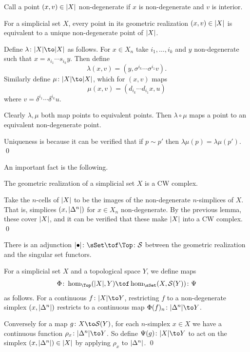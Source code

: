 \elemm

Call a point $(x,v)\in\mathopen{}\mathclose{\left|X\right|}$ {\emphcolor non-degenerate} if $x$ is non-degenerate and $v$ is interior.

\blemm

    For a simplicial set $X$, every point in its geometric realization $(x,v)\in\mathopen{}\mathclose{\left|X\right|}$ is equivalent to a unique non-degenerate point of $\mathopen{}\mathclose{\left|X\right|}$.

\elemm

\bproof

    Define $\lambda\colon\abs X\to\abs X$ as follows.
    For $x\in X_n$ take $i_1,\dots,i_k$ and $y$ non-degenerate such that $x=s_{i_1}\cdots s_{i_k}y$.
    Then define
    $$ \lambda(x,v) = (y,\sigma^{i_k}\cdots\sigma^{i_1}v) . $$
    Similarly define $\mu\colon\abs X\to\abs X$, which for $(x,v)$ maps
    $$ \mu(x,v) = (d_{i_k}\cdots d_{i_1}x,u) $$
    where $v=\delta^{i_1}\cdots\delta^{i_k}u$.

    Clearly $\lambda,\mu$ both map points to equivalent points.
    Then $\lambda\circ\mu$ maps a point to an equivalent non-degenerate point.

    Uniqueness is because it can be verified that if $p\sim p'$ then $\lambda\mu(p)=\lambda\mu(p')$.
    \qed

\eproof

An important fact is the following.

\bthrm

    The geometric realization of a simplicial set $X$ is a CW complex.

\ethrm

\bproof

    Take the $n$-cells of $\mathopen{}\mathclose{\left|X\right|}$ to be the images of the non-degenerate $n$-simplices of $X$.
    That is, simplices $(x,\mathopen{}\mathclose{\left|\Delta^n\right|})$ for $x\in X_n$ non-degenerate.
    By the previous lemma, these cover $\mathopen{}\mathclose{\left|X\right|}$, and it can be verified that these make $\mathopen{}\mathclose{\left|X\right|}$ into a CW complex.
    \qed

\eproof

\bthrm

    There is an adjunction $\abs\bul\colon\sSet\tof\Top\colon\S$ between the geometric realization and the singular set functors.

\ethrm

\bproof

    For a simplicial set $X$ and a topological space $Y$, we define maps
    $$ \Phi\colon\hom_\Top(\abs X,Y) \tof \hom_\sSet(X,\S(Y))\colon\Psi $$
    as follows.
    For a continuous $f\colon\abs X\to Y$, restricting $f$ to a non-degenerate simplex $(x,\mathopen{}\mathclose{\left|\Delta^n\right|})$ restricts to a continuous map $\Phi(f)_n\colon\abs{\Delta^n}\to Y$.

    Conversely for a map $g\colon X\to\S(Y)$, for each $n$-simplex $x\in X$ we have a continuous function $\rho_x\colon\abs{\Delta^n}\to Y$.
    So define $\Psi(g)\colon\abs X\to Y$ to act on the simplex $(x,\mathopen{}\mathclose{\left|\Delta^n\right|})\in\mathopen{}\mathclose{\left|X\right|}$ by applying $\rho_x$ to $\mathopen{}\mathclose{\left|\Delta^n\right|}$.
    \qed

\eproof

